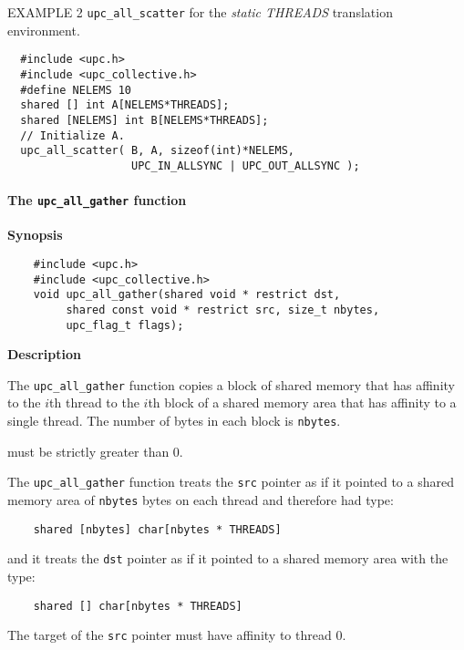 \np EXAMPLE 2 {\tt upc\_all\_scatter} for the {\em static THREADS} 
translation environment.

\begin{verbatim}
  #include <upc.h>
  #include <upc_collective.h>
  #define NELEMS 10
  shared [] int A[NELEMS*THREADS];
  shared [NELEMS] int B[NELEMS*THREADS];
  // Initialize A.
  upc_all_scatter( B, A, sizeof(int)*NELEMS,
                   UPC_IN_ALLSYNC | UPC_OUT_ALLSYNC );
\end{verbatim}

\paragraph{The {\tt upc\_all\_gather} function}

{\bf Synopsis} 

\npf\vspace{-2.5em} 

\begin{verbatim}
    #include <upc.h>
    #include <upc_collective.h>
    void upc_all_gather(shared void * restrict dst,
         shared const void * restrict src, size_t nbytes,
         upc_flag_t flags);
\end{verbatim}

{\bf Description} 

\np The {\tt upc\_all\_gather} function copies a block of shared memory
that has affinity to the $i$th thread to the $i$th block
of a shared memory area that has affinity to a single thread.
The number of bytes in each block is {\tt nbytes}.

 must be strictly greater than 0.

\np The {\tt upc\_all\_gather} function treats the {\tt src} pointer
as if it pointed to a shared memory area of {\tt nbytes} bytes on each
thread and therefore had type:

\begin{verbatim}
    shared [nbytes] char[nbytes * THREADS]
\end{verbatim}  

\np and it treats the {\tt dst} pointer as if it pointed to a shared
memory area with the type:

\begin{verbatim}
    shared [] char[nbytes * THREADS]
\end{verbatim} 

\np The target of the {\tt src} pointer must have affinity to thread 0.

